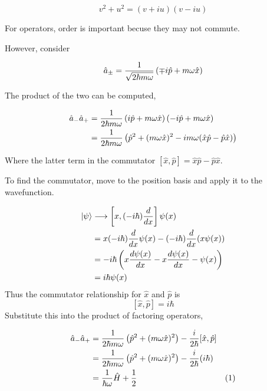 \documentclass[english, 11pt]{article}
\begin{document}
      \[ v^2 + u^2 = (v+iu)(v-iu) \]

      For operators, order is important becuse they may not commute.\newline

      However, consider

      \[ \hat{a}_{\pm} = \frac{1}{\sqrt{2\hbar m \omega}} \left( \mp i \hat{p} + m\omega \hat{x} \right) \]

      The product of the two can be computed,

      \begin{align*}
        \hat{a}_-\hat{a}_+ & = \frac{1}{2\hbar m \omega} \left( i\hat{p} + m\omega \hat{x} \right)\left( -i\hat{p} + m\omega\hat{x} \right) \\
        & = \frac{1}{2\hbar m \omega} \left( \hat{p}^2 + (m\omega \hat{x})^2 - im\omega(\hat{x}\hat{p} - \hat{p}\hat{x}) \right)
      \end{align*}

      Where the latter term in the commutator $[\hat{x}, \hat{p}] = \hat{x}\hat{p}-\hat{p}\hat{x}$. \newline

      To find the commutator, move to the position basis and apply it to the wavefunction.

      \begin{align*}
         [\hat{x}, \hat{p}]\ket{\psi} & \longrightarrow \left[x, (-i\hbar)\f{d}{dx} \right]\psi(x)  \\
         & = x(-i\hbar)\f{d}{dx} \psi(x) - (-i\hbar)\f{d}{dx} (x\psi(x)) \\
         & = -i\hbar \left( x \f{d\psi(x)}{dx} - x\f{d\psi(x)}{dx} - \psi(x) \right) \\
         &  = i\hbar\psi(x)
       \end{align*}
       Thus the commutator relationship for $\hat{x}$ and $\hat{p}$ is
       \[ [\hat{x},\hat{p}] = i\hbar \]
       Substitute this into the product of factoring operators,

       \begin{align*}
         \hat{a}_-\hat{a}_+ & = \frac{1}{2\hbar m \omega} \left( \hat{p}^2 + (m\omega \hat{x})^2 \right) - \frac{i}{2\hbar}[\hat{x},\hat{p}] \\
         & = \frac{1}{2\hbar m \omega} \left( \hat{p}^2 + (m\omega\hat{x})^2 \right) - \frac{i}{2\hbar}(i\hbar) \\
         & = \frac{1}{\hbar \omega}\hat{H} + \frac{1}{2} & (1)
       \end{align*}
\end{document}
